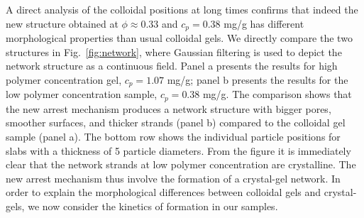 \documentclass[preprint,amsmath,amssymb,superscriptaddress]{revtex4-1}
\begin{document}
% 

% 
% 

A direct analysis of the colloidal positions at long times confirms that indeed the new structure obtained at
$\phi\approx 0.33$ and $c_p=0.38$ mg/g has different morphological properties than usual colloidal gels.
We directly compare the two structures in Fig.~\ref{fig:network}, where Gaussian filtering is used to depict the network structure as a continuous field.
Panel a presents the results for high
polymer concentration gel, $c_p=1.07$ mg/g; panel b presents the results for the low polymer concentration sample, $c_p=0.38$ mg/g.
The comparison shows that the new arrest mechanism produces a network structure with bigger pores, smoother surfaces, and thicker strands (panel b) compared
to the colloidal gel sample (panel a). The bottom row shows the individual particle positions for slabs with a thickness of 5 particle diameters.
From the figure it is immediately clear that the network strands at low polymer concentration are crystalline. The new arrest mechanism thus
involve the formation of a crystal-gel network. In order to explain the morphological differences between colloidal gels and crystal-gels,
we now consider the kinetics of formation in our samples. 
\end{document}

